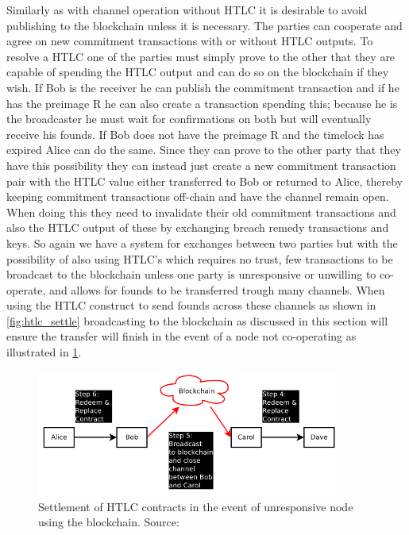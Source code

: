 Similarly as with channel operation without HTLC it is desirable to avoid publishing to the blockchain unless it is necessary. The parties can cooperate and agree on new commitment transactions with or without HTLC outputs. To resolve a HTLC one of the parties must simply prove to the other that they are capable of spending the HTLC output and can do so on the blockchain if they wish. If Bob is the receiver he can publish the commitment transaction and if he has the preimage R he can also create a transaction spending this; because he is the broadcaster he must wait for confirmations on both but will eventually receive his founds. If Bob does not have the preimage R and the timelock has expired Alice can do the same. Since they can prove to the other party that they have this possibility they can instead just create a new commitment transaction pair with the HTLC value either transferred to Bob or returned to Alice, thereby keeping  commitment transactions off-chain and have the channel remain open. When doing this they need to invalidate their old commitment transactions and also the HTLC output of these by exchanging breach remedy transactions and keys. So again we have a system for exchanges between two parties but with the possibility of also using HTLC's which requires no trust, few transactions to be broadcast to the blockchain unless one party is unresponsive or unwilling to co-operate, and allows for founds to be transferred trough many channels.  
When using the HTLC construct to send founds across these channels as shown in \cref{fig:htlc_settle} broadcasting to the blockchain as discussed in this section will ensure the transfer will finish in the event of a node not co-operating as illustrated in \cref{fig:htlc_bc}.

\begin{figure}[ht]
    \centering
    \includegraphics[width=10cm]{figures/htlc_bc.png}
    \caption{ Settlement of HTLC contracts in the event of unresponsive node using the blockchain. Source: \cite{poon2015bitcoin}}
    \label{fig:htlc_bc}
\end{figure}

